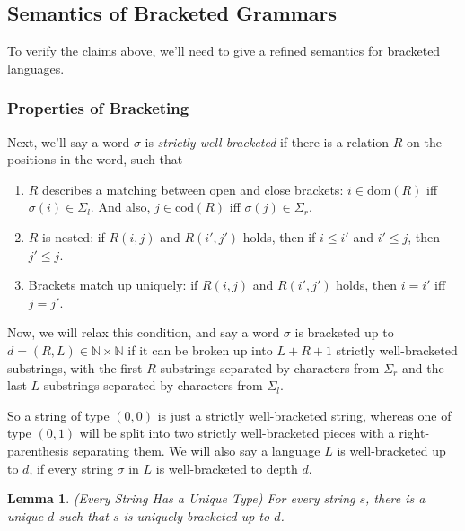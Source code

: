\documentclass{article}
\newcommand{\nats}{\mathbb{N}}
\newcommand{\zero}{(0,0)}
\newtheorem{lemma}{Lemma}
\begin{document}
\subsection{Semantics of Bracketed Grammars}

To verify the claims above, we'll need to give a refined semantics for bracketed 
languages. 

\subsubsection{Properties of Bracketing}

Next, we'll say a word $\sigma$ is \emph{strictly well-bracketed} if there is a
relation $R$ on the positions in the word, such that

\begin{enumerate}
\item $R$ describes a matching between open and close brackets: 
      $i \in \mathrm{dom}(R)$ iff $\sigma(i) \in \Sigma_l$. And also,
      $j \in \mathrm{cod}(R)$ iff $\sigma(j) \in \Sigma_r$.
\item $R$ is nested: if $R(i, j)$ and $R(i', j')$ holds, then if $i \leq i'$ and $i' \leq j$, then $j' \leq j$. 
\item Brackets match up uniquely: if $R(i, j)$ and $R(i', j')$ holds, then $i = i'$ iff $j = j'$. 
\end{enumerate}

Now, we will relax this condition, and say a word $\sigma$ is
bracketed up to $d = (R, L) \in \nats \times \nats$ if it can
be broken up into $L + R + 1$ strictly well-bracketed substrings, with 
the first $R$ substrings separated by characters from $\Sigma_r$ and
the last $L$ substrings separated by characters from $\Sigma_l$. 

So a string of type $\zero$ is just a strictly well-bracketed string,
whereas one of type $(0, 1)$ will be split into two strictly
well-bracketed pieces with a right-parenthesis separating them. We
will also say a language $L$ is well-bracketed up to $d$, if every
string $\sigma$ in $L$ is well-bracketed to depth $d$.



\begin{lemma}{(Every String Has a Unique Type)}
For every string $s$, there is a unique $d$ such that $s$ is uniquely
bracketed up to $d$.
\end{lemma}
\end{document}
